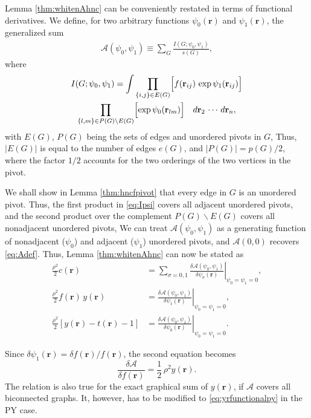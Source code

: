 \documentclass[preprint]{revtex4-1}
\newcommand{\vct}[1]{\mathbf{#1}}
\providecommand{\vr}{} %
\renewcommand{\vr}{\vct{r}}
\newcommand{\A}{\mathcal{A}}
\begin{document}
Lemma \ref{thm:whitenAhnc} can be conveniently
restated in terms of functional derivatives.
%
We define, for two arbitrary functions $\psi_0(\vr)$ and $\psi_1(\vr)$,
the generalized sum
\begin{align}
  \A(\psi_0, \psi_1)
\equiv
  \sum_G \frac{ I(G; \psi_0, \psi_1) } { s(G) },
\label{eq:Apsi}
\end{align}
where
\begin{multline}
  I(G; \psi_0, \psi_1)
=
  \int
    \prod_{\{i, j\} \in E(G)}
    \Bigl[
      f(\vr_{ij}) \, \exp \psi_1(\vr_{ij})
    \Bigr]
  \\
    \prod_{
      \{l, m\} \in P(G) \backslash E(G)
    }
    \Bigl[
      \exp \psi_0(\vr_{lm})
    \Bigr]
  \quad
  d\vr_2 \, \cdots \, d\vr_n,
  \label{eq:Ipsi}
\end{multline}
with $E(G)$, $P(G)$ being the sets of edges and unordered pivots in $G$,
%
Thus, $|E(G)|$ is equal to the number of edges $e(G)$,
and $|P(G)| = p(G)/2$,
where the factor $1/2$ accounts for the two orderings
of the two vertices in the pivot.



We shall show in Lemma \ref{thm:hncfpivot} that
every edge in $G$ is an unordered pivot.
%
Thus,
the first product in \eqref{eq:Ipsi}
covers all adjacent unordered pivots,
and the second product over the complement
$P(G) \backslash E(G)$
covers all nonadjacent unordered pivots,
%
We can treat
$\A(\psi_0, \psi_1)$
as a generating function
of nonadjacent ($\psi_0$) and adjacent ($\psi_1$) unordered pivots,
%
and $\A(0,0)$ recovers \eqref{eq:Adef}.
%
Thus, Lemma \ref{thm:whitenAhnc} can now be stated as
\begin{align*}
  \frac{\rho^2}{2} c(\vr)
&=
  \left.
  \sum_{\sigma = 0, 1}
  \frac{ \delta \A(\psi_0, \psi_1) } { \delta \psi_\sigma(\vr) }
  \right|_{\psi_0 = \psi_1 = 0},
\\
%
%
%
  \frac{\rho^2}{2} f(\vr) \, y(\vr)
&=
  \left.
  \frac{ \delta \A(\psi_0, \psi_1) } { \delta \psi_1(\vr) }
  \right|_{\psi_0 = \psi_1 = 0},
\\
%
%
%
  \frac{\rho^2}{2}[ y(\vr) - t(\vr) - 1 ]
&=
  \left.
  \frac{ \delta \A(\psi_0, \psi_1) } { \delta \psi_0(\vr) }
  \right|_{\psi_0 = \psi_1 = 0}.
\end{align*}

Since $\delta \psi_1(\vr) = \delta f(\vr)/ f(\vr)$,
the second equation becomes\cite{hiroike1957, morita1958, *morita1960, *morita1960I}
\begin{equation}
  \frac{ \delta \A } { \delta f(\vr) }
  = \frac{1}{2} \, \rho^2 y(\vr).
  \label{eq:yrfunctional}
\end{equation}
The relation is also true for the exact graphical sum of $y(\vr)$,
if $\A$ covers all biconnected graphs.
%
It, however, has to be modified to \eqref{eq:yrfunctionalpy} in the PY case.
\end{document}
